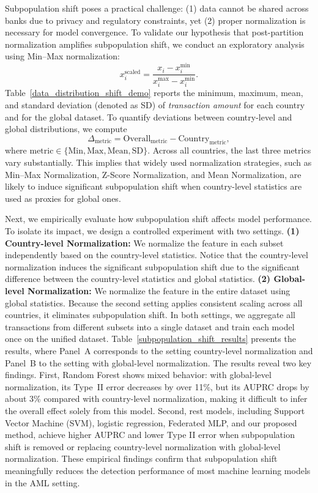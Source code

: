 Subpopulation shift poses a practical challenge: (1) data cannot be shared across banks due to privacy and regulatory constraints, yet (2) proper normalization is necessary for model convergence. To validate our hypothesis that post-partition normalization amplifies subpopulation shift, we conduct an exploratory analysis using Min--Max normalization:
\begin{equation}
    \label{min_max_normalization}
    x^{\text{scaled}}_i = \frac{x_i - x^{\text{min}}_i}{x^{\text{max}}_i - x^{\text{min}}_i}.
\end{equation}
Table~\ref{data_distribution_shift_demo} reports the minimum, maximum, mean, and standard deviation (denoted as SD) of \emph{transaction amount} for each country and for the global dataset. To quantify deviations between country-level and global distributions, we compute
\begin{equation}
    \Delta_{\text{metric}} = \text{Overall}_{\text{metric}} - \text{Country}_{\text{metric}},
\end{equation}
where $\text{metric} \in \{\text{Min}, \text{Max}, \text{Mean}, \text{SD}\}$. Across all countries, the last three metrics vary substantially. This implies that widely used normalization strategies, such as Min--Max Normalization, Z-Score Normalization, and Mean Normalization, are likely to induce significant subpopulation shift when country-level statistics are used as proxies for global ones.

Next, we empirically evaluate how subpopulation shift affects model performance. To isolate its impact, we design a controlled experiment with two settings. \textbf{(1) Country-level Normalization:} We normalize the feature in each subset independently based on the country-level statistics. Notice that the country-level normalization induces the significant subpopulation shift due to the significant difference between the country-level statistics and global statistics. \textbf{(2) Global-level Normalization:} We normalize the feature in the entire dataset using global statistics. Because the second setting applies consistent scaling across all countries, it eliminates subpopulation shift. In both settings, we aggregate all transactions from different subsets into a single dataset and train each model once on the unified dataset. Table~\ref{subpopulation_shift_results} presents the results, where Panel~A corresponds to the setting country-level normalization and Panel~B to the setting with global-level normalization. The results reveal two key findings. First, Random Forest shows mixed behavior: with global-level normalization, its Type~II error decreases by over 11\%, but its AUPRC drops by about 3\% compared with country-level normalization, making it difficult to infer the overall effect solely from this model. Second, rest models, including Support Vector Machine (SVM), logistic regression, Federated MLP, and our proposed method, achieve higher AUPRC and lower Type II error when subpopulation shift is removed or replacing country-level normalization with global-level normalization. These empirical findings confirm that subpopulation shift meaningfully reduces the detection performance of most machine learning models in the AML setting. 


